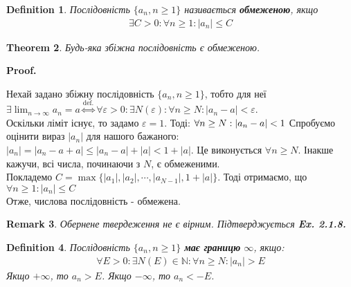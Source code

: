\documentclass[a4paper, 14pt]{article}
\makeatletter
\def\qed{$\blacksquare$}
\theoremstyle{theoremdd}
\newtheorem{theorem}{Theorem}[subsection]
\theoremstyle{theoremdd}
\newtheorem{definition}[theorem]{Definition}
\theoremstyle{theoremdd}
\theoremstyle{theoremdd}
\theoremstyle{theoremdd}
\theoremstyle{theoremdd}
\newtheorem{remark}[theorem]{Remark}
\theoremstyle{theoremdd}
\theoremstyle{theoremdd}
\renewenvironment{proof}[1][Proof.\\]{\par
\pushQED{\hfill \qed}%
\normalfont \topsep6\p@\@plus6\p@\relax
\trivlist
\item\relax
{\bfseries
#1\@addpunct{.}}\hspace\labelsep\ignorespaces
}{%
\popQED\endtrivlist\@endpefalse
}
\makeatother
\begin{document}
	\begin{definition}
	Послідовність $\{a_n, n \geq 1\}$ називається \textbf{обмеженою}, якщо
	\begin{align*}
	\exists C>0: \forall n \geq 1: |a_n|\leq C
	\end{align*}
	\end{definition}
	
	\begin{theorem}
	Будь-яка збіжна послідовність є обмеженою.
	\end{theorem}
	
	\begin{proof}
	Нехай задано збіжну послідовність $\{a_n, n \geq 1\}$, тобто для неї\\ $\displaystyle \exists \lim_{n \to \infty} a_n = a \overset{\textrm{def.}}{\iff}\forall \varepsilon > 0: \exists N(\varepsilon): \forall n \geq N: |a_n-a| < \varepsilon$.\\
	Оскільки ліміт існує, то задамо $\varepsilon = 1$. Тоді: $\forall n \geq N: \abs{a_n-a}<1$
	Спробуємо оцінити вираз $|a_n|$ для нашого бажаного:\\
	$|a_n| = |a_n - a + a| \leq |a_n-a|+|a| < 1 + |a|$. Це виконується $\forall n \geq N$. Інакше кажучи, всі числа, починаючи з $N$, є обмеженими.\\
	Покладемо $C=\max\{|a_1|,|a_2|,\cdots, |a_{N-1}|, 1+|a|\}$. Тоді отримаємо, що $\forall n\geq1: |a_n|\leq C$ \\ 
	Отже, числова послідовність - обмежена.
	\end{proof}
	
	\begin{remark}
	Обернене твердеження не є вірним. Підтверджується \textbf{Ex. 2.1.8.}
	\end{remark}
	
	\begin{definition}
	Послідовність $\{a_n, n \geq 1\}$ \textbf{має границю} $\infty$, якщо: 			\begin{align*}
	\forall E>0: \exists N(E) \in \mathbb{N}: \forall n \geq N: |a_n|>E
	\end{align*}
	Якщо $+\infty$, то $a_n > E$. \hspace{0.5cm} Якщо $-\infty$, то $a_n < -E$.
	\end{definition}
	
\end{document}

